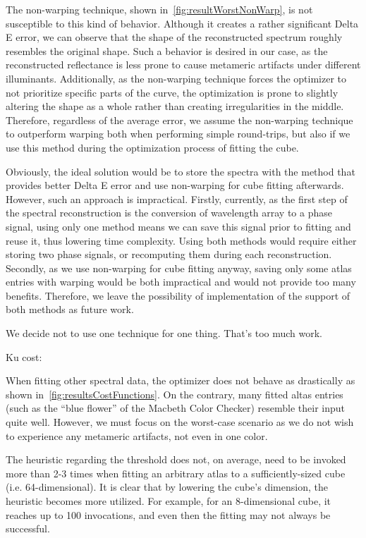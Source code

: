 The non-warping technique, shown in~\cref{fig:resultWorstNonWarp}, is not susceptible to this kind of behavior. Although it creates a rather significant Delta E error, we can observe that the shape of the reconstructed spectrum roughly resembles the original shape. Such a behavior is desired in our case, as the reconstructed reflectance is less prone to cause metameric artifacts under different illuminants. Additionally, as the non-warping technique forces the optimizer to not prioritize specific parts of the curve, the optimization is prone to slightly altering the shape as a whole rather than creating 
irregularities in the middle. Therefore, regardless of the average error, we assume the non-warping technique to outperform warping both when performing simple round-trips, but also if we use this method during the optimization process of fitting the cube.



Obviously, the ideal solution would be to store the spectra with the method that provides better Delta E error and use non-warping for cube fitting afterwards. However, such an approach is impractical. Firstly, currently, as the first step of the spectral reconstruction is the conversion of wavelength array to a phase signal, using only one method means we can save this signal prior to fitting and reuse it, thus lowering time complexity. Using both methods would require either storing two phase signals, or recomputing them during each reconstruction. Secondly, as we use non-warping for cube fitting anyway, saving only some atlas entries with warping would be both impractical and would not provide too many benefits. Therefore, we leave the possibility of implementation of the support of both methods as future work.

We decide not to use one technique for one thing. That's too much work.

Ku cost:

When fitting other spectral data, the optimizer does not behave as drastically as shown in~\cref{fig:resultsCostFunctions}. On the contrary, many fitted altas entries (such as the ``blue flower'' of the Macbeth Color Checker) resemble their input quite well. However, we must focus on the worst-case scenario as we do not wish to experience any metameric artifacts, not even in one color.

The heuristic regarding the threshold does not, on average, need to be invoked more than 2-3 times when fitting an arbitrary atlas to a sufficiently-sized cube (i.e. 64-dimensional). It is clear that by lowering the cube's dimension, the heuristic becomes more utilized. For example, for an 8-dimensional cube, it reaches up to 100 invocations, and even then the fitting may not always be successful.

